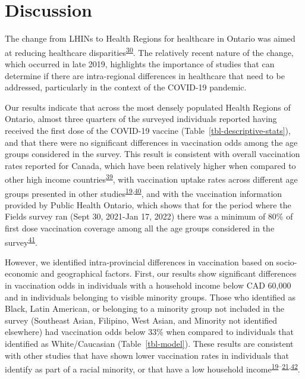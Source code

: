 \documentclass[
  letterpaper,
  DIV=11,
  numbers=noendperiod]{scrartcl}
\begin{document}
\hypertarget{discussion}{%
\section{Discussion}\label{discussion}}

The change from LHINs to Health Regions for healthcare in Ontario was
aimed at reducing healthcare
disparities\textsuperscript{\protect\hyperlink{ref-tsasis2012}{30}}. The
relatively recent nature of the change, which occurred in late 2019,
highlights the importance of studies that can determine if there are
intra-regional differences in healthcare that need to be addressed,
particularly in the context of the COVID-19 pandemic.

Our results indicate that across the most densely populated Health
Regions of Ontario, almost three quarters of the surveyed individuals
reported having received the first dose of the COVID-19 vaccine
(Table~\ref{tbl-descriptive-stats}), and that there were no significant
differences in vaccination odds among the age groups considered in the
survey. This result is consistent with overall vaccination rates
reported for Canada, which have been relatively higher when compared to
other high income
countries\textsuperscript{\protect\hyperlink{ref-dube2022}{39}}, with
vaccination uptake rates across different age groups presented in other
studies\textsuperscript{\protect\hyperlink{ref-guay2022}{19},\protect\hyperlink{ref-macdonald2021}{40}},
and with the vaccination information provided by Public Health Ontario,
which shows that for the period where the Fields survey ran (Sept 30,
2021-Jan 17, 2022) there was a minimum of 80\% of first dose vaccination
coverage among all the age groups considered in the
survey\textsuperscript{\protect\hyperlink{ref-ontario-covid}{41}}.

However, we identified intra-provincial differences in vaccination based
on socio-economic and geographical factors. First, our results show
significant differences in vaccination odds in individuals with a
household income below CAD 60,000 and in individuals belonging to
visible minority groups. Those who identified as Black, Latin American,
or belonging to a minority group not included in the survey (Southeast
Asian, Filipino, West Asian, and Minority not identified elsewhere) had
vaccination odds below 33\% when compared to individuals that identified
as White/Caucasian (Table~\ref{tbl-model}). These results are consistent
with other studies that have shown lower vaccination rates in
individuals that identify as part of a racial minority, or that have a
low household
income\textsuperscript{\protect\hyperlink{ref-guay2022}{19}--\protect\hyperlink{ref-hussain2022}{21},\protect\hyperlink{ref-carter2022}{42}}.
\end{document}
